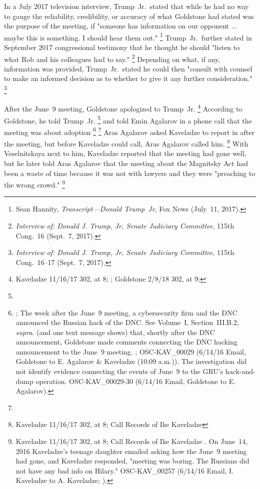 In a July 2017 television interview, Trump~Jr.\ stated that while he had no way to gauge the reliability, credibility, or accuracy of what Goldstone had stated was the purpose of the meeting, if "someone has information on our opponent ... maybe this is something.
I should hear them out."%
\footnote{Sean Hannity, \textit{Transcript---Donald Trump~Jr}, Fox News (July~11, 2017).}
Trump~Jr.\ further stated in September 2017 congressional testimony that he thought he should "listen to what Rob and his colleagues had to say."%
\footnote{\textit{Interview of: Donald J. Trump, Jr, Senate Judiciary Committee}, 115th Cong.~16 (Sept.~7, 2017).}
Depending on what, if any, information was provided, Trump~Jr.\ stated he could then "consult with counsel to make an informed decision as to whether to give it any further consideration."%
\footnote{\textit{Interview of: Donald J. Trump, Jr, Senate Judiciary Committee}, 115th Cong.~16--17 (Sept.~7, 2017).}

After the June~9 meeting, Goldstone apologized to Trump~Jr.%
\footnote{Kaveladze 11/16/17 302, at 8; ; Goldstone 2/8/18 302, at 9; }
According to Goldstone, he told Trump~Jr.
\footnote{}
and told Emin Agalarov in a phone call that the meeting was about adoption
\footnote{;
The week after the June~9 meeting, a cybersecurity firm and the DNC announced the Russian hack of the DNC\null.
See Volume~I, Section~III.B.2, \textit{supra}.
(and one text message shows) that, shortly after the DNC announcement, Goldstone made comments connecting the DNC hacking announcement to the June~9 meeting.
; OSC-KAV\_00029 (6/14/16 Email, Goldstone to E. Agalarov \& Kaveladze (10:09 a.m.)).
The investigation did not identify evidence connecting the events of June~9 to the GRU's hack-and-dump operation.
OSC-KAV\_00029-30 (6/14/16 Email, Goldstone to E. Agalarov).}
\footnote{}
Aras Agalarov asked Kaveladze to report in after the meeting, but before Kaveladze could call, Aras Agalarov called him.%
\footnote{Kaveladze 11/16/17 302, at 8; Call Records of Ike Kaveladze }
With Veselnitskaya next to him, Kaveladze reported that the meeting had gone well, but he later told Aras Agalarov that the meeting about the Magnitsky Act had been a waste of time because it was not with lawyers and they were "preaching to the wrong crowd."%
\footnote{Kaveladze 11/16/17 302, at 8; Call Records of Ike Kaveladze .
On June~14, 2016 Kaveladze's teenage daughter emailed asking how the June~9 meeting had gone, and Kaveladze responded, "meeting was boring.
The Russians did not have any bad info on Hilary."
OSC-KAV\_00257 (6/14/16 Email, I. Kaveladze to A. Kaveladze; ).}

